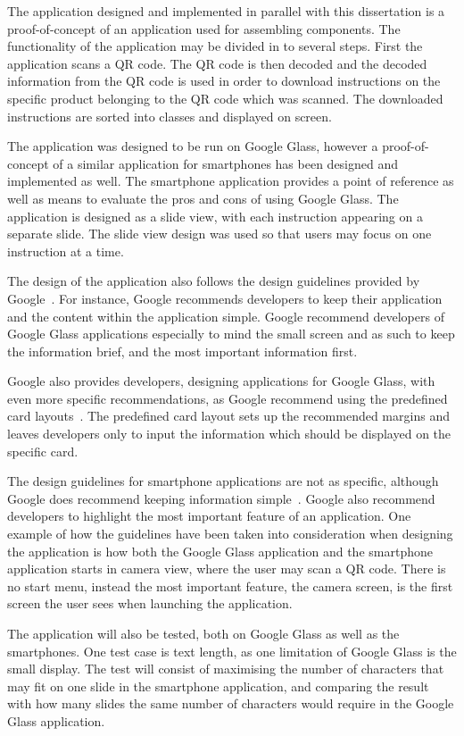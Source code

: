 The application designed and implemented in parallel with this dissertation is a proof-of-concept of an application used for assembling components. The functionality of the application may be divided in to several steps. First the application scans a QR code. The QR code is then decoded and the decoded information from the QR code is used in order to download instructions on the specific product belonging to the QR code which was scanned. The downloaded instructions are sorted into classes and displayed on screen.

The application was designed to be run on Google Glass, however a proof-of-concept of a similar application for smartphones has been designed and implemented as well. The smartphone application provides a point of reference as well as means to evaluate the pros and cons of using Google Glass. The application is designed as a slide view, with each instruction appearing on a separate slide. The slide view design was used so that users may focus on one instruction at a time.

The design of the application also follows the design guidelines provided by Google~\cite{glassDesignPrinciples}. For instance, Google recommends developers to keep their application and the content within the application simple. Google recommend developers of Google Glass applications especially to mind the small screen and as such to keep the information brief, and the most important information first.

Google also provides developers, designing applications for Google Glass, with even more specific recommendations, as Google recommend using the predefined card layouts~\cite{cardLayout}. The predefined card layout sets up the recommended margins and leaves developers only to input the information which should be displayed on the specific card.

The design guidelines for smartphone applications are not as specific, although Google does recommend keeping information simple~\cite{androidDesignPrinciples}. Google also recommend developers to highlight the most important feature of an application. One example of how the guidelines have been taken into consideration when designing the application is how both the Google Glass application and the smartphone application starts in camera view, where the user may scan a QR code. There is no start menu, instead the most important feature, the camera screen, is the first screen the user sees when launching the application.

The application will also be tested, both on Google Glass as well as the smartphones. One test case is text length, as one limitation of Google Glass is the small display. The test will consist of maximising the number of characters that may fit on one slide in the smartphone application, and comparing the result with how many slides the same number of characters would require in the Google Glass application.

